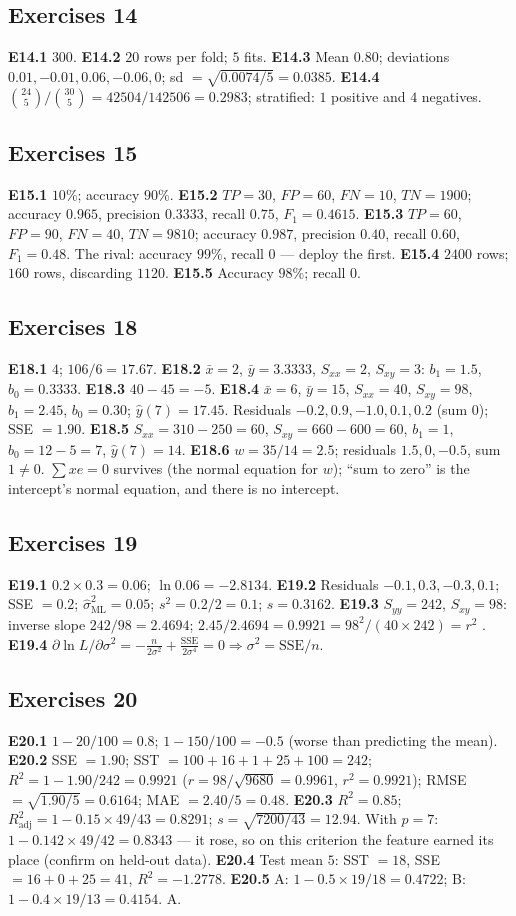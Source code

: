 \documentclass[11pt]{article}
\newcommand{\ans}[1]{\subsection*{#1}}
\begin{document}
\ans{Exercises 14}
\textbf{E14.1} $300$.
\textbf{E14.2} $20$ rows per fold; $5$ fits.
\textbf{E14.3} Mean $0.80$; deviations $0.01, -0.01, 0.06, -0.06, 0$; sd
$= \sqrt{0.0074/5} = 0.0385$.
\textbf{E14.4} $\binom{24}{5}/\binom{30}{5} = 42504/142506 = 0.2983$;
stratified: $1$ positive and $4$ negatives.

\ans{Exercises 15}
\textbf{E15.1} $10\%$; accuracy $90\%$.
\textbf{E15.2} $TP = 30$, $FP = 60$, $FN = 10$, $TN = 1900$; accuracy $0.965$,
precision $0.3333$, recall $0.75$, $F_1 = 0.4615$.
\textbf{E15.3} $TP = 60$, $FP = 90$, $FN = 40$, $TN = 9810$; accuracy $0.987$,
precision $0.40$, recall $0.60$, $F_1 = 0.48$. The rival: accuracy $99\%$,
recall $0$ --- deploy the first.
\textbf{E15.4} $2400$ rows; $160$ rows, discarding $1120$.
\textbf{E15.5} Accuracy $98\%$; recall $0$.

\ans{Exercises 18}
\textbf{E18.1} $4$; $106/6 = 17.67$.
\textbf{E18.2} $\bar x = 2$, $\bar y = 3.3333$, $S_{xx} = 2$, $S_{xy} = 3$:
$b_1 = 1.5$, $b_0 = 0.3333$.
\textbf{E18.3} $40 - 45 = -5$.
\textbf{E18.4} $\bar x = 6$, $\bar y = 15$, $S_{xx} = 40$, $S_{xy} = 98$,
$b_1 = 2.45$, $b_0 = 0.30$; $\hat y(7) = 17.45$. Residuals $-0.2, 0.9, -1.0,
0.1, 0.2$ (sum $0$); SSE $= 1.90$.
\textbf{E18.5} $S_{xx} = 310 - 250 = 60$, $S_{xy} = 660 - 600 = 60$, $b_1 = 1$,
$b_0 = 12 - 5 = 7$, $\hat y(7) = 14$.
\textbf{E18.6} $w = 35/14 = 2.5$; residuals $1.5, 0, -0.5$, sum $1 \ne 0$.
$\sum xe = 0$ survives (the normal equation for $w$); ``sum to zero'' is the
intercept's normal equation, and there is no intercept.

\ans{Exercises 19}
\textbf{E19.1} $0.2 \times 0.3 = 0.06$; $\ln 0.06 = -2.8134$.
\textbf{E19.2} Residuals $-0.1, 0.3, -0.3, 0.1$; SSE $= 0.2$;
$\hat\sigma^2_{\text{ML}} = 0.05$; $s^2 = 0.2/2 = 0.1$; $s = 0.3162$.
\textbf{E19.3} $S_{yy} = 242$, $S_{xy} = 98$: inverse slope $242/98 = 2.4694$;
$2.45/2.4694 = 0.9921 = 98^2/(40 \times 242) = r^2$ \checkmark.
\textbf{E19.4} $\partial\ln L/\partial\sigma^2 = -\frac{n}{2\sigma^2} +
\frac{\mathrm{SSE}}{2\sigma^4} = 0 \Rightarrow \sigma^2 = \mathrm{SSE}/n$.

\ans{Exercises 20}
\textbf{E20.1} $1 - 20/100 = 0.8$; $1 - 150/100 = -0.5$ (worse than predicting
the mean).
\textbf{E20.2} SSE $= 1.90$; SST $= 100 + 16 + 1 + 25 + 100 = 242$;
$R^2 = 1 - 1.90/242 = 0.9921$ ($r = 98/\sqrt{9680} = 0.9961$, $r^2 = 0.9921$);
RMSE $= \sqrt{1.90/5} = 0.6164$; MAE $= 2.40/5 = 0.48$.
\textbf{E20.3} $R^2 = 0.85$; $R^2_{\text{adj}} = 1 - 0.15 \times 49/43 = 0.8291$;
$s = \sqrt{7200/43} = 12.94$. With $p = 7$: $1 - 0.142 \times 49/42 = 0.8343$
--- it rose, so on this criterion the feature earned its place (confirm on
held-out data).
\textbf{E20.4} Test mean $5$: SST $= 18$, SSE $= 16 + 0 + 25 = 41$,
$R^2 = -1.2778$.
\textbf{E20.5} A: $1 - 0.5 \times 19/18 = 0.4722$; B: $1 - 0.4 \times 19/13 =
0.4154$. A.
\end{document}
